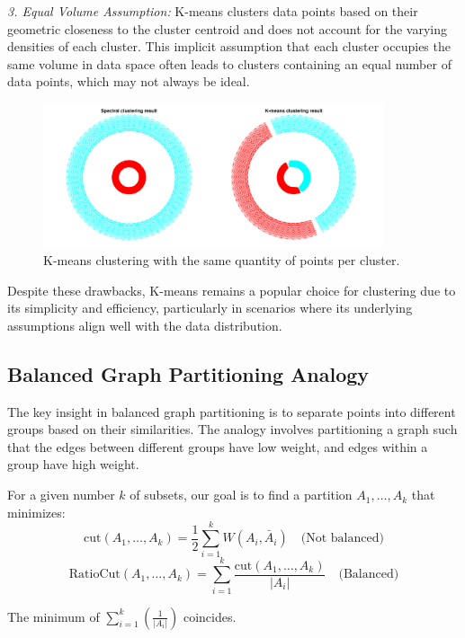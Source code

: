 \documentclass[unicode,11pt,a4paper,oneside,numbers=endperiod,openany]{scrartcl}
\begin{document}
\textit{3. Equal Volume Assumption:}
K-means clusters data points based on their geometric closeness to the cluster centroid and does not account for the varying densities of each cluster. This implicit assumption that each cluster occupies the same volume in data space often leads to clusters containing an equal number of data points, which may not always be ideal.

\begin{figure}[H]
    \centering
    \includegraphics[trim=0cm 0cm 0cm 0cm, clip, width=10cm]{img3.png}
    \caption{K-means clustering with the same quantity of points per cluster.}
    \label{fig:img5}
\end{figure}

Despite these drawbacks, K-means remains a popular choice for clustering due to its simplicity and efficiency, particularly in scenarios where its underlying assumptions align well with the data distribution.


\subsection{Balanced Graph Partitioning Analogy}

The key insight in balanced graph partitioning is to separate points into different groups based on their similarities. The analogy involves partitioning a graph such that the edges between different groups have low weight, and edges within a group have high weight.

For a given number \( k \) of subsets, our goal is to find a partition \( A_1, \ldots, A_k \) that minimizes:
\[
\text{cut}(A_1, \ldots, A_k) = \frac{1}{2}\sum_{i=1}^{k} W(A_i, \bar{A}_i) \quad \text{(Not balanced)}
\]
\[
\text{RatioCut}(A_1, \ldots, A_k) = \sum_{i=1}^{k} \frac{\text{cut}(A_1, \ldots, A_k)}{|A_i|} \quad \text{(Balanced)}
\]

The minimum of \(\sum_{i=1}^{k}(\frac{1}{|A_i|})\) coincides.
\end{document}
